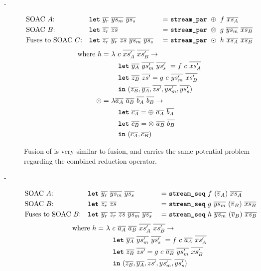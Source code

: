 \begin{description}
\item[-]
  \begin{align*}
    &\mbox{SOAC $A$:} &\hfill& \kw{let}~\seq{y_{r}}~\seq{ys_{m}}~\seq{ys_{s}}&~=~&\kw{stream\_par}~\oplus~f~\seq{xs_{A}} \\
    &\mbox{SOAC $B$:} &\hfill& \kw{let}~\seq{z_{r}}~\seq{zs}&~=~&\kw{stream\_par}~\otimes~g~\seq{ys_{m}}~\seq{xs_{B}} \\
    &\mbox{Fuses to SOAC $C$:} &\hfill& \kw{let}~\seq{z_{r}}~\seq{y_{r}}~\seq{zs}~\seq{ys_{m}}~\seq{ys_{s}}&~=~&\kw{stream\_par}~\odot~h~\seq{xs_{A}}~\seq{xs_{B}}
  \end{align*}
  \begin{align*}
    \mbox{where}~h =~& \lambda~c~\overline{xs'_{A}}~\overline{xs'_{B}} \rightarrow \\
        & \quad \mbox{\texttt{\bfseries{let}}}~\overline{y_{A}}~\overline{ys'_{m}}~\overline{ys'_{s}}~ = f~c~\overline{xs'_{A}} \\
        & \quad \mbox{\texttt{\bfseries{let}}}~\overline{z_{B}}~\overline{zs'} = g~c~\overline{ys'_{m}}~\overline{xs'_{B}} \\
        & \quad \mbox{\texttt{\bfseries{in}}}~(\overline{z_{B}},\overline{y_{A}},\overline{zs'},\overline{ys'_{m}},\overline{ys'_{s}}) \\
    \odot =~& \lambda \overline{a_{A}}~\overline{a_{B}}~\overline{b_{A}}~\overline{b_{B}} \rightarrow \\
        & \quad \mbox{\texttt{\bfseries{let}}}~\overline{c_{A}} = \oplus~\overline{a_{A}}~\overline{b_{A}} \\
        & \quad \mbox{\texttt{\bfseries{let}}}~\overline{c_{B}} = \otimes~\overline{a_{B}}~\overline{b_{B}} \\
        & \quad \mbox{\texttt{\bfseries{in}}}~(\overline{c_{A}}, \overline{c_{B}})
  \end{align*}

  Fusion of \StreamPar{} is very similar to  fusion, and
  carries the same potential problem regarding the combined reduction
  operator.

\item[-]
  \begin{align*}
    &\mbox{SOAC $A$:} &\hfill& \kw{let}~\seq{y_{r}}~\seq{ys_{m}}~\seq{ys_{s}} &~=~& \kw{stream\_seq}~f~(\seq{v}_{A})~\seq{xs_{A}} \\
    & \mbox{SOAC $B$:} &\hfill& \kw{let}~\seq{z_{r}}~\seq{zs} &~=~& \kw{stream\_seq}~g~\seq{ys_{m}}~(\seq{v}_{B})~\seq{xs_{B}} \\
    & \mbox{Fuses to SOAC $B$:} &\hfill& \kw{let}~\seq{y_{r}}~\seq{z_{r}}~\seq{zs}~\seq{ys_{m}}~\seq{ys_{s}} &~=~& \kw{stream\_seq}~h~\seq{ys_{m}}~(\seq{v}_{B})~\seq{xs_{B}}
  \end{align*}
  \begin{align*}
    \mbox{where}~h =~& \lambda~c~\overline{a_{A}}~\overline{a_{B}}~\overline{xs'_{A}}~\overline{xs'_{B}} \rightarrow \\
        & \quad \mbox{\texttt{\bfseries{let}}}~\overline{y_{A}}~\overline{ys'_{m}}~\overline{ys'_{s}}~ = f~c~\overline{a_{A}}~\overline{xs'_{A}} \\
        & \quad \mbox{\texttt{\bfseries{let}}}~\overline{z_{B}}~\overline{zs'} = g~c~\overline{a_{B}}~\overline{ys'_{m}}~\overline{xs'_{B}} \\
        & \quad \mbox{\texttt{\bfseries{in}}}~(\overline{z_{B}},\overline{y_{A}},\overline{zs'},\overline{ys'_{m}},\overline{ys'_{s}}) \\
  \end{align*}


\end{description}
